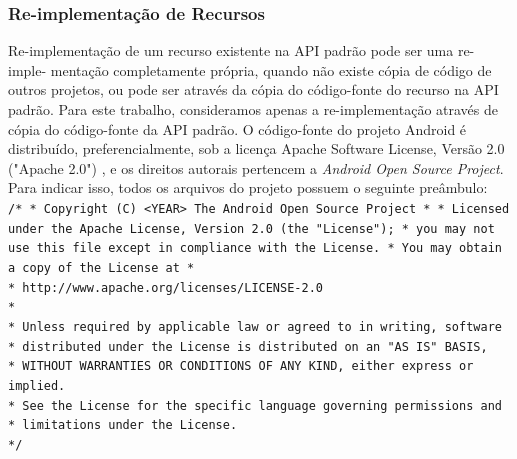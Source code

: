 \subsubsection{Re-implementação de Recursos}

Re-implementação de um recurso existente na API padrão pode ser uma re-imple- mentação
completamente própria, quando não existe cópia de código de outros projetos, ou pode
ser através da cópia do código-fonte do recurso na API padrão. Para este trabalho,
consideramos apenas a re-implementação através de cópia do código-fonte da API padrão.
O código-fonte do projeto Android é distribuído, preferencialmente, sob a licença Apache 
Software License, Versão 2.0 ("Apache 2.0") \cite{License}, e os direitos autorais
pertencem a \textit{Android Open Source Project}. Para indicar isso, todos os arquivos
do projeto possuem o seguinte preâmbulo:
\texttt{
\newline
/* \newline
 * Copyright (C) <YEAR> The Android Open Source Project \newline
 * \newline
 * Licensed under the Apache License, Version 2.0 (the "License"); \newline
 * you may not use this file except in compliance with the License. \newline
 * You may obtain a copy of the License at \newline
 * \\
 *      http://www.apache.org/licenses/LICENSE-2.0 \\
 * \\
 * Unless required by applicable law or agreed to in writing, software \\
 * distributed under the License is distributed on an "AS IS" BASIS, \\
 * WITHOUT WARRANTIES OR CONDITIONS OF ANY KIND, either express or implied. \\
 * See the License for the specific language governing permissions and \\
 * limitations under the License. \\
 */
} 

